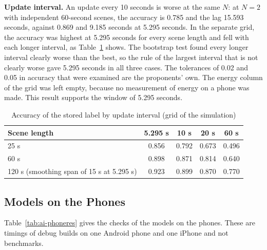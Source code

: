 \textbf{Update interval.} An update every 10 seconds is worse at the same $N$: at $N=2$ with independent 60-second scenes, the accuracy is 0.785 and the lag 15.593 seconds, against 0.869 and 9.185 seconds at 5.295 seconds. In the separate grid, the accuracy was highest at 5.295 seconds for every scene length and fell with each longer interval, as Table~\ref{tab:ai-grid} shows. The bootstrap test found every longer interval clearly worse than the best, so the rule of the largest interval that is not clearly worse gave 5.295 seconds in all three cases. The tolerances of 0.02 and 0.05 in accuracy that were examined are the proponents' own. The energy column of the grid was left empty, because no measurement of energy on a phone was made. This result supports the window of 5.295 seconds.

\begin{table}[htbp]
    \centering
    \caption{Accuracy of the stored label by update interval (grid of the simulation)}\label{tab:ai-grid}
    \small
    \renewcommand{\arraystretch}{1.2}
    \begin{tabular}{|l|c|c|c|c|}
        \hline
        \textbf{Scene length} & \textbf{5.295 s} & \textbf{10 s} & \textbf{20 s} & \textbf{60 s} \\
        \hline
        25 s & 0.856 & 0.792 & 0.673 & 0.496 \\
        \hline
        60 s & 0.898 & 0.871 & 0.814 & 0.640 \\
        \hline
        120 s (smoothing span of 15 s at 5.295 s) & 0.923 & 0.899 & 0.870 & 0.770 \\
        \hline
    \end{tabular}
\end{table}

\subsection{Models on the Phones}
\label{sec:ai-phones}
Table~\ref{tab:ai-phoneres} gives the checks of the models on the phones. These are timings of debug builds on one Android phone and one iPhone and not benchmarks.

